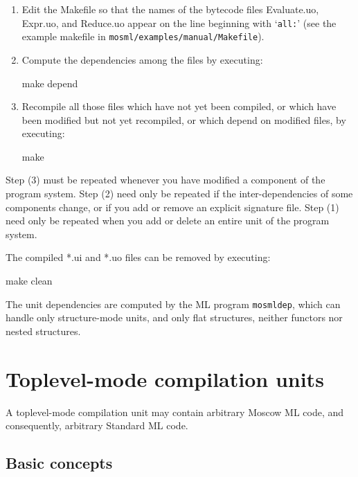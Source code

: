 \documentclass[fleqn,a4paper]{article}
\begin{document}
\begin{enumerate}
\item Edit the Makefile so that the names of the bytecode files
  Evaluate.uo, Expr.uo, and Reduce.uo appear on the line beginning
  with `{\tt all:}' (see the example makefile in
  \texttt{mosml/examples/manual/Makefile}).

\item Compute the dependencies among the files by executing:
\begin{program}
make depend
\end{program}

\item Recompile all those files which have not yet been compiled, or
  which have been modified but not yet recompiled, or which depend on
  modified files, by executing:
        
\begin{program}
make    
\end{program}
\end{enumerate}

\noindent Step (3) must be repeated whenever you have modified a
component of the program system.  Step (2) need only be repeated if
the inter-dependencies of some components change, or if you add or
remove an explicit signature file.  Step (1) need only be repeated
when you add or delete an entire unit of the program system.

The compiled *.ui and *.uo files can be removed by executing:

\begin{program}
make clean  
\end{program}

\noindent The unit dependencies are computed by the ML program
{\tt mosmldep}, which can handle only structure-mode units, and only
flat structures, neither functors nor nested structures.


\newpage

 \section{Toplevel-mode compilation units}
\label{sec-toplevel-mode}

A toplevel-mode compilation unit may contain arbitrary Moscow ML code,
and consequently, arbitrary Standard ML code.  


\subsection{Basic concepts}
\end{document}
